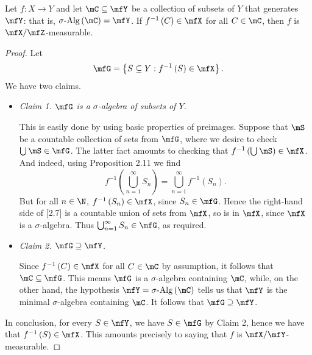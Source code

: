 \documentclass[pmath450]{subfiles}
\begin{document}
    \begin{prop}{}
        Let $f:X\to Y$ and let $\mC\subseteq\mfY$ be a collection of subsets of $Y$ that generates $\mfY$: that is, $\sigalg\left( \mC \right)=\mfY$. If $f^{-1}\left( C \right)\in\mfX$ for all $C\in\mC$, then $f$ is $\mfX /\mfZ$-measurable.
    \end{prop}

    \clearpage
    \begin{proof}
        Let
        \begin{equation*}
            \mfG = \left\lbrace S\subseteq Y: f^{-1}\left( S \right)\in\mfX \right\rbrace.
        \end{equation*}
        We have two claims.
        \begin{itemize}
            \item \textit{Claim 1. $\mfG$ is a $\sigma$-algebra of subsets of $Y$.}

                \begin{subproof}
                    This is easily done by using basic properties of preimages. Suppose that $\mS$ be a countable collection of sets from $\mfG$, where we desire to check $\bigcup\mS\in\mfG$. The latter fact amounts to checking that $f^{-1}\left( \bigcup^{}_{}\mS \right)\in\mfX$. And indeed, using Proposition 2.11 we find
                    \begin{equation}
                        f^{-1}\left( \bigcup^{\infty}_{n=1}S_n \right) = \bigcup^{\infty}_{n=1}f^{-1}\left( S_n \right).
                    \end{equation}
                    But for all $n\in\N$, $f^{-1}\left( S_n \right)\in\mfX$, since $S_n\in\mfG$. Hence the right-hand side of [2.7] is a countable union of sets from $\mfX$, so is in $\mfX$, since $\mfX$ is a $\sigma$-algebra. Thus $\bigcup^{\infty}_{n=1}S_n\in\mfG$, as required.
                \end{subproof}

            \item \textit{Claim 2. $\mfG\supseteq\mfY$.}

                \begin{subproof}
                    Since $f^{-1}\left( C \right)\in\mfX$ for all $C\in\mC$ by assumption, it follows that $\mC\subseteq\mfG$. This means $\mfG$ is a $\sigma$-algebra containing $\mC$, while, on the other hand, the hypothesis $\mfY=\sigalg\left( \mC \right)$ tells us that $\mfY$ is the minimal $\sigma$-algebra containing $\mC$. It follows that $\mfG\supseteq\mfY$.
                \end{subproof}
        \end{itemize} 
        In conclusion, for every $S\in\mfY$, we have $S\in\mfG$ by Claim 2, hence we have that $f^{-1}\left( S \right)\in\mfX$. This amounts precisely to saying that $f$ is $\mfX /\mfY$-measurable.
    \end{proof}
\end{document}
